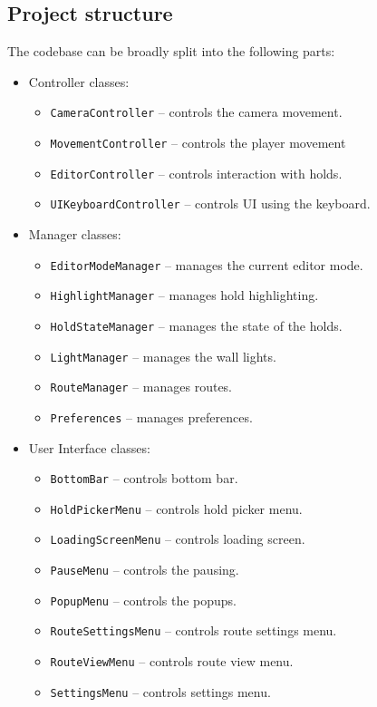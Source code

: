 \subsection{Project structure}
The codebase can be broadly split into the following parts:

\begin{itemize}
	\item Controller classes:
	\begin{itemize}
		\item \verb|CameraController| -- controls the camera movement.
		\item \verb|MovementController| -- controls the player movement
		\item \verb|EditorController| -- controls interaction with holds.
		\item \verb|UIKeyboardController| -- controls UI using the keyboard.
	\end{itemize}
	\item Manager classes:
	\begin{itemize}
		\item \verb|EditorModeManager| -- manages the current editor mode.
		\item \verb|HighlightManager| -- manages hold highlighting.
		\item \verb|HoldStateManager| -- manages the state of the holds.
		\item \verb|LightManager| -- manages the wall lights.
		\item \verb|RouteManager| -- manages routes.
		\item \verb|Preferences| -- manages preferences.
	\end{itemize}
	\item User Interface classes:
	\begin{itemize}
		\item \verb|BottomBar| -- controls bottom bar.
		\item \verb|HoldPickerMenu| -- controls hold picker menu.
		\item \verb|LoadingScreenMenu| -- controls loading screen.
		\item \verb|PauseMenu| -- controls the pausing.
		\item \verb|PopupMenu| -- controls the popups.
		\item \verb|RouteSettingsMenu| -- controls route settings menu.
		\item \verb|RouteViewMenu| -- controls route view menu.
		\item \verb|SettingsMenu| -- controls settings menu.

\end{itemize}
\end{itemize}
